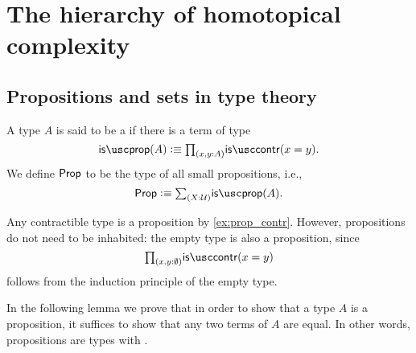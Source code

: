 
\section{The hierarchy of homotopical complexity}
\label{chap:hierarchy}


\subsection{Propositions and sets in type theory}

\begin{defn}
A type $A$ is said to be a  if there is a term of type
\begin{equation*}
\isprop(A)\defeq\prd{x,y:A}\iscontr(x=y).
\end{equation*}
We define $\mathsf{Prop}$ to be the type of all small propositions, i.e.,
\begin{equation*}
  \prop\defeq\sm{X:\UU}\isprop(A).
\end{equation*}
\end{defn}

\begin{eg}\label{eg:prop_contr}
Any contractible type is a proposition by \cref{ex:prop_contr}. However, propositions do not need to be inhabited: the empty type is also a proposition, since
\begin{equation*}
\prd{x,y:\emptyt}\iscontr(x=y)
\end{equation*}
follows from the induction principle of the empty type.
\end{eg}

In the following lemma we prove that in order to show that a type $A$ is a proposition, it suffices to show that any two terms of $A$ are equal. In other words, propositions are types with .

